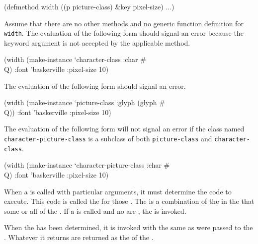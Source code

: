 (defmethod width ((p picture-class) &key pixel-size) ...)
\endcode

\noindent Assume that there are no other methods and no generic
function definition for {\tt width}. The evaluation of the
following form should signal an error because 
the keyword argument  is not accepted by the applicable method.

\code
 (width (make-instance `character-class :char #\\Q) 
        :font 'baskerville :pixel-size 10)
\endcode

The evaluation of the following form should signal an error.

\code
 (width (make-instance `picture-class :glyph (glyph #\\Q)) 
        :font 'baskerville :pixel-size 10)
\endcode

The evaluation of the following form will not signal an error
if the class named {\tt character-picture-class} is a subclass of
both {\tt picture-class} and {\tt character-class}.

\code
 (width (make-instance `character-picture-class :char #\\Q)
        :font 'baskerville :pixel-size 10)
\endcode

\endsubsubsection%

\endSubsection%


When a  is called with particular arguments, it must
determine the code to execute.  This code is called the 
 for those .
The  is a 
combination of the  in the 
that  some or all of the .  If a  is      
called and no  are ,
the   is invoked.

When the  has been determined,
it is invoked with the same  as were passed to the .  
Whatever  it returns are returned as the 
of the .


